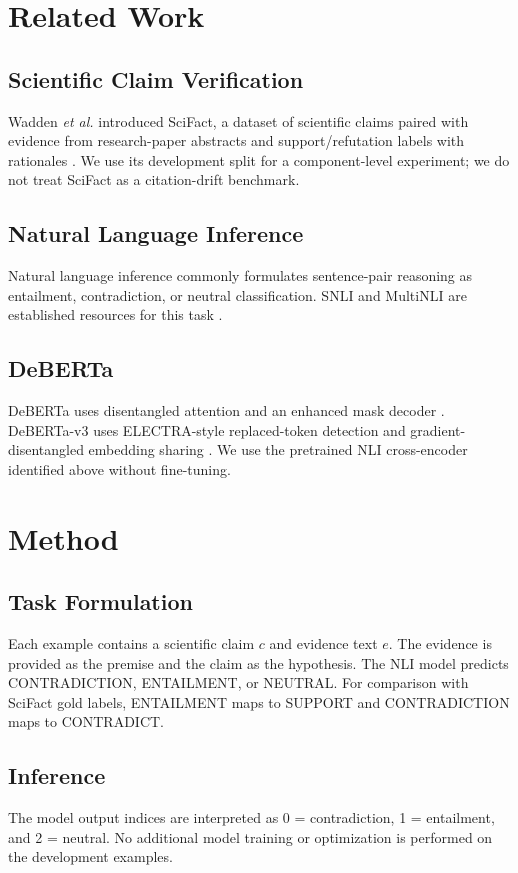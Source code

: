 \documentclass[conference]{IEEEtran}
\begin{document}
\section{Related Work}
\subsection{Scientific Claim Verification}
Wadden \emph{et al.} introduced SciFact, a dataset of scientific claims paired with evidence from research-paper abstracts and support/refutation labels with rationales \cite{wadden2020fact}. We use its development split for a component-level experiment; we do not treat SciFact as a citation-drift benchmark.

\subsection{Natural Language Inference}
Natural language inference commonly formulates sentence-pair reasoning as entailment, contradiction, or neutral classification. SNLI and MultiNLI are established resources for this task \cite{bowman2015large,williams2018broad}.

\subsection{DeBERTa}
DeBERTa uses disentangled attention and an enhanced mask decoder \cite{he2021deberta}. DeBERTa-v3 uses ELECTRA-style replaced-token detection and gradient-disentangled embedding sharing \cite{he2023debertav3}. We use the pretrained NLI cross-encoder identified above without fine-tuning.

\section{Method}
\subsection{Task Formulation}
Each example contains a scientific claim $c$ and evidence text $e$. The evidence is provided as the premise and the claim as the hypothesis. The NLI model predicts CONTRADICTION, ENTAILMENT, or NEUTRAL. For comparison with SciFact gold labels, ENTAILMENT maps to SUPPORT and CONTRADICTION maps to CONTRADICT.

\subsection{Inference}
The model output indices are interpreted as 0 = contradiction, 1 = entailment, and 2 = neutral. No additional model training or optimization is performed on the development examples.
\end{document}
